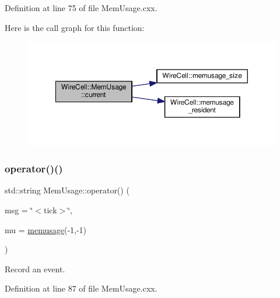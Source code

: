Definition at line 75 of file Mem\+Usage.\+cxx.

Here is the call graph for this function\+:
\nopagebreak
\begin{figure}[H]
\begin{center}
\leavevmode
\includegraphics[width=350pt]{class_wire_cell_1_1_mem_usage_a0413f9a3a49204c96d5462dbb3922b44_cgraph}
\end{center}
\end{figure}
\mbox{\label{class_wire_cell_1_1_mem_usage_a3ab27a762267e6401a3e10f1487c34d3}} 
\subsubsection{\texorpdfstring{operator()()}{operator()()}}
{\footnotesize\ttfamily std\+::string Mem\+Usage\+::operator() (\begin{DoxyParamCaption}\item[{std\+::string}]{msg = {\ttfamily \char`\"{}$<$tick$>$\char`\"{}},  }\item[{\hyperlink{class_wire_cell_1_1_mem_usage_ab022bc829c4166d0161f3c91195f062f}{Mem\+Usage\+::memusage}}]{mu = {\ttfamily \hyperlink{class_wire_cell_1_1_mem_usage_ab022bc829c4166d0161f3c91195f062f}{memusage}(-\/1,-\/1)} }\end{DoxyParamCaption})}



Record an event. 



Definition at line 87 of file Mem\+Usage.\+cxx.

\mbox{\label{class_wire_cell_1_1_mem_usage_a136b6c458ca2cae89527fbceb33ea2c4}} 
